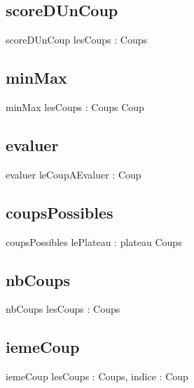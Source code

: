 	\subsection{scoreDUnCoup}
\begin{algorithme}
	\signaturefonction
	{scoreDUnCoup}
	{lesCoups : Coups}
	{\naturel}
\end{algorithme}
	\subsection{minMax}
\begin{algorithme}
	\signaturefonction
	{minMax}
	{lesCoups : Coups}
	{Coup}
\end{algorithme}

	\subsection{evaluer}
\begin{algorithme}
	\signaturefonction
	{evaluer}
	{leCoupAEvaluer : Coup}
	{\naturel}
\end{algorithme}

	\subsection{coupsPossibles}
\begin{algorithme}
	\signaturefonction
	{coupsPossibles}
	{lePlateau : plateau}
	{Coups}
\end{algorithme}

	\subsection{nbCoups}
\begin{algorithme}
	\signaturefonction
	{nbCoups}
	{lesCoups : Coups}
	{\naturel}
\end{algorithme}

	\subsection{iemeCoup}
\begin{algorithme}
	\signaturefonction
	{iemeCoup}
	{lesCoups : Coups, indice : \naturelNonNul}
	{Coup}
\end{algorithme}
